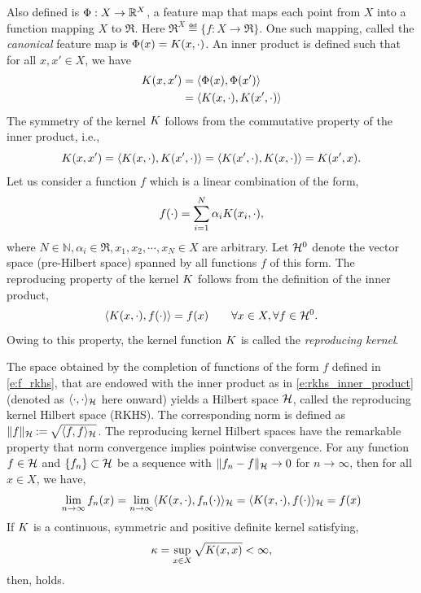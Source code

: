 Also defined is $\Phi: X \to \mathbb{R}^X$, a feature map that maps each point from $X$ into a function mapping $X$ to $\Re$. Here $\Re^X \eqdef \{f: X \to \Re \}$. One such mapping, called the \textit{canonical} feature map is $\Phi(x) = K(x,\cdot)$. An inner product is defined such that for all $x,x' \in X$, we have
\begin{equation}
\begin{aligned}
\Kern(x,x') &= \langle \featuremap(x), \featuremap(x')\rangle \\
& = \langle \Kern(x,\cdot), \Kern(x',\cdot)\rangle
\end{aligned}
\label{e:rkhs_inner_product}
\end{equation}
The symmetry of the kernel $K$ follows from the commutative property of the inner product, i.e.,
\[
K(x,x') = \langle K(x, \cdot), K(x',\cdot) \rangle = \langle K(x',\cdot), K(x,\cdot) \rangle = K(x', x). 
\]
Let us consider a function $f$ which is a linear combination of the form,
\begin{equation}
f(\cdot) = \sum_{i=1}^N \alpha_i \Kern(x_i, \cdot),
\label{e:f_rkhs}
\end{equation}
where $N \in \mathbb{N}, \alpha_i \in \Re, x_1,x_2,\cdots, x_N \in X$ are arbitrary. Let ${\cal H}^0$ denote the vector space (pre-Hilbert space) spanned by all functions $f$ of this form. 
The reproducing property of the kernel $K$ follows from the definition of the inner product,
\[
\langle K(x,\cdot), f(\cdot)\rangle = f(x) \qquad \forall x \in X, \forall f \in {\cal H}^0.
\]
Owing to this property, the kernel function $K$ is called the \textit{reproducing kernel}. 

The space obtained by the completion of functions of the form $f$ defined in \eqref{e:f_rkhs}, that are endowed with the inner product as in \eqref{e:rkhs_inner_product} (denoted as $\langle \cdot, \cdot \rangle_{{\cal H}}$ here onward) yields a Hilbert space ${\cal H}$, called the reproducing kernel Hilbert space (RKHS). The corresponding norm is defined as $\|f\|_{\cal H} \mathbin{:=} \sqrt{\langle f, f \rangle_{\cal H}}$. The reproducing kernel Hilbert spaces have the remarkable property that norm convergence implies pointwise convergence. 
For any function $f\in{\cal H}$ and $\{f_n\}\subset {\cal H}$ be a sequence with $\|f_n - f\|_{\cal H} \to 0$ for $n \to \infty$, then for all $x \in X$, we have,
\[
\lim_{n\to\infty} f_n(x) = \lim_{n \to \infty} \langle K(x,\cdot),  f_n(\cdot) \rangle_{\cal H} = \langle K(x, \cdot), f(\cdot) \rangle_{\cal H} = f(x)
\]
If $K$ is a continuous, symmetric and positive definite kernel satisfying, 
\[
\kappa = \sup_{x \in X} \sqrt{K(x,x)} < \infty,
\]
then,  holds.

